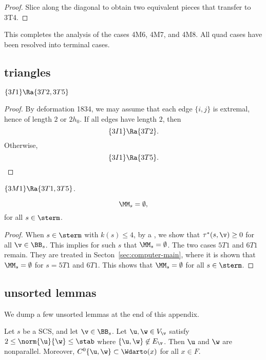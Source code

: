 \begin{proof} 
Slice along the diagonal to obtain two equivalent pieces that transfer to 3T4.
\end{proof}


This completes the analysis of the cases 4M6, 4M7, and 4M8.  
All quad cases have been resolved into terminal cases.



\subsection{triangles}



\begin{lemma}[]
$\{3I1\}\Ra \{3T2,3T5\}$
\end{lemma}

\begin{proof} By deformation 1834,  we may assume that each edge $\{i,j\}$ is extremal, hence
of length $2$ or $2h_0$.  If all edges have length $2$, then
\[
\{3I1\}\Ra\{3T2\}.
\]
Otherwise,
\[
\{3I1\}\Ra\{3T5\}.
\]
\end{proof}

\begin{lemma}[]
$\{3M1\}\Ra \{3T1,3T5\}$.
\end{lemma}


\begin{lemma}\label{lemma:sterm-empty}
\[
\MM_s=\emptyset,
\]
for all $s\in\sterm$.
\end{lemma}

\begin{proof}
When $s\in \sterm$
with $k(s)\le 4$, by a , we show
that $\tau^*(s,\v) \ge0$ for all $\v\in \BB_s$.  This implies for such $s$
that $\MM_s=\emptyset$.  The two cases $5T1$ and $6T1$ remain.
They are treated in Secton~\ref{sec:computer-main}, where it is shown
that $\MM_s=\emptyset$ for $ s=5T1$ and $6T1$.  This
shows that $\MM_s=\emptyset$ for all $s\in \sterm$.
\end{proof}

\subsection{unsorted lemmas}

We dump a few unsorted lemmas at the end of this appendix.

\begin{lemma}[]\label{lemma:2hm-slice1}
Let $s$ be a SCS, and let $\v\in \BB_s$.
Let $\u,\w\in V_\v$ satisfy $2\le\norm{\u}{\w}\le \stab$ where
$\{\u,\w\}\not\in E_\v$.  Then $\u$ and $\w$ are nonparallel.
Moreover,
$C^0\{\u,\w\}\subset \Wdarto(x)$ for all $x\in F$.
\end{lemma}


